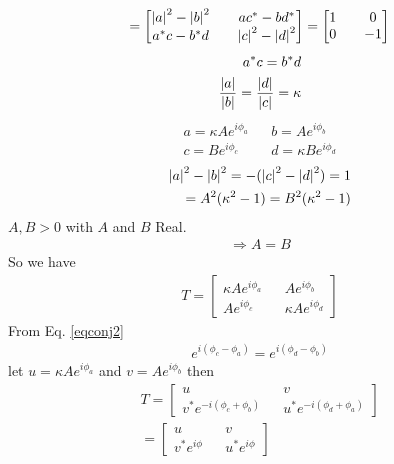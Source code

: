 \documentclass[12pt]{article}
\begin{document}
\begin{equation}
=\begin{bmatrix}
\abs{a}^2 - \abs{b}^2 && ac^*-bd^*\\
a^*c -b^*d && \abs{c}^2-\abs{d}^2
\end{bmatrix}=
\begin{bmatrix}
1 && 0\\
0 && -1
\end{bmatrix}
\end{equation}
\begin{align}
\label{eqconj2}
a^*c = b^*d\\
\frac{\abs{a}}{\abs{b}} = \frac{\abs{d}}{\abs{c}} = \kappa \\
\end{align}
\begin{align}
a = \kappa A e^{i \phi_a} && b = A e^{i \phi_b}\\
c =  B e^{i \phi_c} && d = \kappa B e^{i \phi_d}
\end{align}
\begin{align}
\abs{a}^2-\abs{b}^2 = -(\abs{c}^2 - \abs{d}^2) = 1\\
= A^2 (\kappa^2 - 1) = B^2(\kappa^2 -1)\\
\end{align}
$A,B>0$ with $A$ and $B$ Real.
\begin{align}
\Rightarrow A = B
\end{align}
So we have
\begin{align}
T=
\begin{bmatrix}
\kappa A e^{i\phi_a} && A e^{i \phi_b}\\
A e^{i \phi_c} && \kappa A e^{i \phi_d}
\end{bmatrix}
\end{align}
From Eq. \ref{eqconj2}
\begin{align}
e^{i(\phi_c-\phi_a)} = e^{i(\phi_d-\phi_b)}
\end{align}
let $u=\kappa A e^{i\phi_a}$ and $v=Ae^{i\phi_b}$ then
\begin{align}
T=
\begin{bmatrix}
u && v\\
v^* e^{-i(\phi_c+\phi_b)} && u^* e^{-i(\phi_d+\phi_a)}
\end{bmatrix}\\
=
\begin{bmatrix}
u && v\\
v^*e^{i \phi} && u^* e^{i\phi}
\end{bmatrix}
\end{align}
\end{document}
